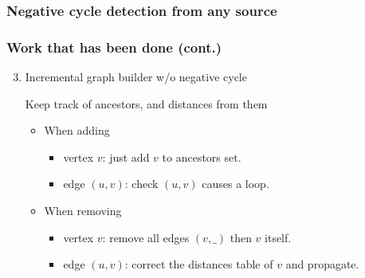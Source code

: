\documentclass{beamer}
\begin{document}
\begin{frame}\frametitle{Negative cycle detection from any source}

\vspace*{8pt}

\begin{center}
\end{center}


\end{frame}


\begin{frame}[fragile]\frametitle{Work that has been done (cont.)}

\begin{enumerate}
\setcounter{enumi}{2}
\item Incremental graph builder w/o negative cycle

Keep track of ancestors, and distances from them

\begin{itemize}

\item When adding
\begin{itemize}
\item\alert{vertex $v$}: just add $v$ to ancestors set.
\item\alert{edge $(u,v)$}: check $(u,v)$ causes a loop.
\end{itemize}

\item When removing
\begin{itemize}
\item\alert{vertex $v$}: remove all edges $(v,\_)$ then $v$ itself.
\item\alert{edge $(u,v)$}: correct the distances table of $v$ and propagate.
\end{itemize}


\end{itemize}

\end{enumerate}

\end{frame}
\end{document}
